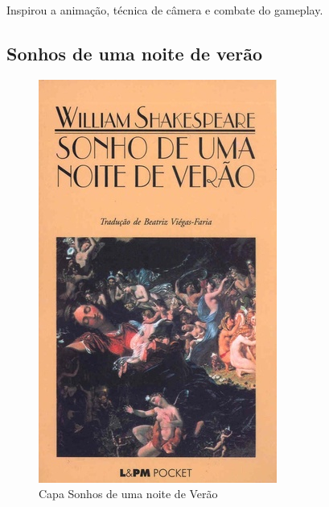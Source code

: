 Inspirou a animação, técnica de câmera e combate do gameplay.

\subsection{Sonhos de uma noite de verão}

\begin{figure}[htb]
	\caption{\label{sonhos_shakespeare} Capa Sonhos de uma noite de Verão}
	\begin{center}
	    \includegraphics[width=\textwidth/2]{imagens/Sonhos.jpg}
	\end{center}
\end{figure}


